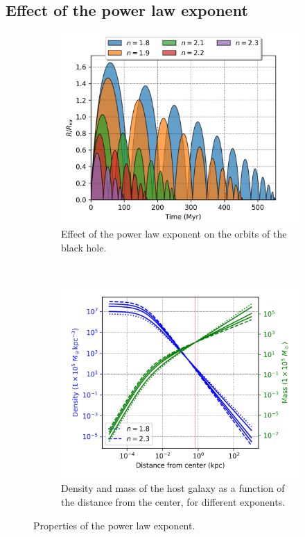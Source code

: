 	\subsection{Effect of the power law exponent}
	\begin{figure}[h]
		\centering
		\begin{subfigure}[t]{0.49\textwidth}
			\includegraphics[width = \textwidth]{"../Files/Week 6/power_law"}
			\caption{Effect of the power law exponent on the orbits of the black hole.}
			\label{fig: powerLawOrbits}
		\end{subfigure}
		~ 
		\begin{subfigure}[t]{0.49\textwidth}
			\includegraphics[width=\textwidth]{"../Files/Week 6/power_law_density"}
			\caption{Density and mass of the host galaxy as a function of the distance from the center, for different exponents.}
			\label{fig: powerLawDensities}
		\end{subfigure}
		\caption{Properties of the power law exponent.}
		\label{fig: powerLaw}
	\end{figure}
	

